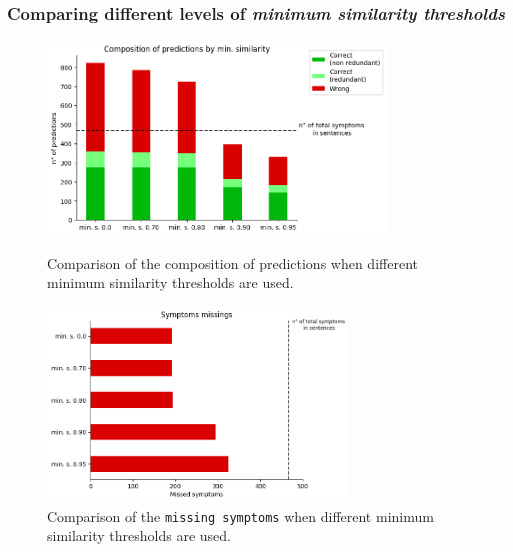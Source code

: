 \subsubsection{Comparing different levels of \textit{minimum similarity thresholds}}
\begin{figure}[h]%
  \centering
  \begin{minipage}[b]{0.4\textwidth}
    \includegraphics[width=9cm]{graphs/comparison_min_similarity}
    \caption{Comparison of the composition of predictions when different minimum similarity thresholds are used.}
  \end{minipage}
  \hfill
  \begin{minipage}[b]{0.4\textwidth}
    \includegraphics[width=8cm]{graphs/comparison_min_similarity_missings}
    \caption{Comparison of the \texttt{missing symptoms} when different minimum similarity thresholds are used.}
  \end{minipage}
\end{figure}

